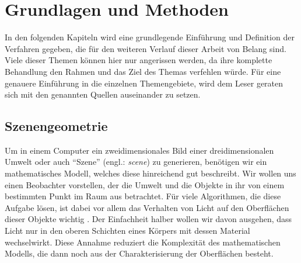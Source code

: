 \section{Grundlagen und Methoden} %
\label{sec:grundlagen_und_methoden}

	In den folgenden Kapiteln wird eine grundlegende Einführung und Definition der Verfahren gegeben, die für den weiteren Verlauf dieser Arbeit von Belang sind.
	Viele dieser Themen können hier nur angerissen werden, da ihre komplette Behandlung den Rahmen und das Ziel des Themas verfehlen würde.
	Für eine genauere Einführung in die einzelnen Themengebiete, wird dem Leser geraten sich mit den genannten Quellen auseinander zu setzen.

	\subsection{Szenengeometrie} %
	\label{sub:szenengeometrie}

		Um in einem Computer ein zweidimensionales Bild einer dreidimensionalen Umwelt oder auch \enquote{Szene} (engl.: \textit{scene}) zu generieren, benötigen wir ein mathematisches Modell, welches diese hinreichend gut beschreibt.
		Wir wollen uns einen Beobachter vorstellen, der die Umwelt und die Objekte in ihr von einem bestimmten Punkt im Raum aus betrachtet.
		Für viele Algorithmen, die diese Aufgabe lösen, ist dabei vor allem das Verhalten von Licht auf den Oberflächen dieser Objekte wichtig \cite{pbrt3, kajiya-lte, veach-thesis}.
		Der Einfachheit halber wollen wir davon ausgehen, dass Licht nur in den oberen Schichten eines Körpers mit dessen Material wechselwirkt.
		Diese Annahme reduziert die Komplexität des mathematischen Modells, die dann noch aus der Charakterisierung der Oberflächen besteht.

